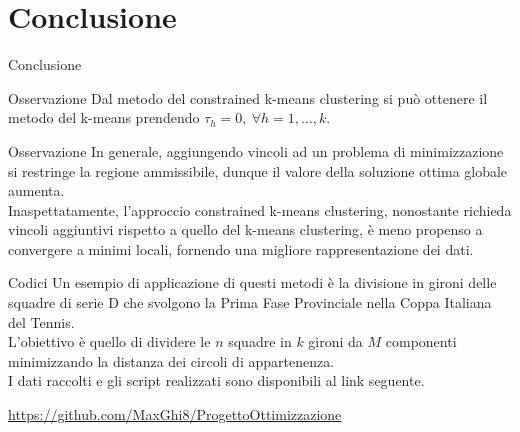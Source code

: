 \documentclass{beamer}
\begin{document}
\section{Conclusione}
\begin{frame}{Conclusione}
	\begin{exampleblock}{Osservazione}
		Dal metodo del constrained k-means clustering si può ottenere il metodo del k-means prendendo $\tau_h=0, \ \forall h=1,\dots,k$.
	\end{exampleblock}
	\begin{exampleblock}{Osservazione}
		In generale, aggiungendo vincoli ad un problema di minimizzazione si restringe la regione ammissibile, dunque il valore della soluzione ottima globale aumenta.\\
		Inaspettatamente, l'approccio constrained k-means clustering, nonostante richieda vincoli aggiuntivi rispetto a quello del k-means clustering, è meno propenso a convergere a minimi locali, fornendo una migliore rappresentazione dei dati.
	\end{exampleblock}
\end{frame}
\begin{frame}{Codici}
	Un esempio di applicazione di questi metodi è la divisione in gironi delle squadre di serie D che svolgono la Prima Fase Provinciale nella Coppa Italiana del Tennis.\\ L'obiettivo è quello di dividere le $n$ squadre in $k$ gironi da $M$ componenti minimizzando la distanza dei circoli di appartenenza.\\
	I dati raccolti e gli script realizzati sono disponibili al link seguente.
	\begin{center}
		\url{https://github.com/MaxGhi8/ProgettoOttimizzazione}
	\end{center}
	 
\end{frame}
\end{document}
